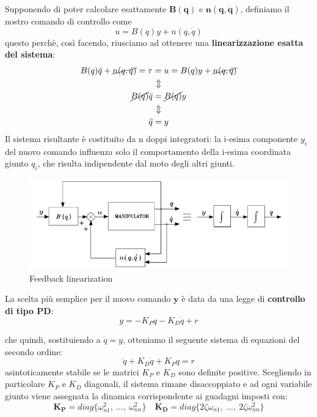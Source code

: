 Supponendo di poter calcolare esattamente $\mathbf{B(q)}$ e $\mathbf{n(q, \dot{q})}$, definiamo il nostro comando di controllo come
\boldmath
$$
u = B(q)y + n(q, \dot{q})
$$
questo perchè, così facendo, riusciamo ad ottenere una \textbf{linearizzazione esatta del sistema}:
\begin{gather*}
B(q)\ddot{q} + \cancel{n(q, \dot{q})} = \tau = u = B(q)y + \cancel{n(q, \dot{q})} \\
\Updownarrow \\
\cancel{B(q)}\ddot{q} = \cancel{B(q)}y \\
\Updownarrow \\
\ddot{q} = y
\end{gather*}
Il sistema risultante è costituito da n doppi integratori: la i-esima componente $y_i$ del nuovo comando influenza solo il comportamento della i-esima coordinata giunto $q_i$, che risulta indipendente dal moto degli altri giunti.


\begin{figure}[H]
	\centering
	\includegraphics[width=0.8\linewidth]{images/centralized_control_1}
	\caption{Feedback linearization}
	\label{fig:centralizedcontrol1}
\end{figure}

La scelta più semplice per il nuovo comando $\mathbf{y}$ è data da una legge di \textbf{controllo di tipo PD}:
$$
y = -K_P q - K_D \dot{q} + r
$$

che quindi, sostituiendo a $\ddot{q} = y$, otteniamo il seguente sistema di equazioni del secondo ordine:
\begin{equation}\label{eq:2nd_order_dyn_feedback_lin}
\ddot{q} + K_D \dot{q} + K_P q = r
\end{equation}
asintoticamente stabile se le matrici $K_P$ e $K_D$ sono definite positive.
Scegliendo in particolare $K_P$ e $K_D$ diagonali, il sistema rimane disaccoppiato e ad ogni variabile giunto viene assegnata la dinamica corrispondente ai guadagni imposti con:
\unboldmath
$$
\mathbf{K_P} = diag\{\omega_{n1}^2, \ \dots, \ \omega_{nn}^2\}
\quad
\mathbf{K_D} = diag\{2\zeta\omega_{n1}, \ \dots, \ 2\zeta\omega_{nn}^2\}
$$

